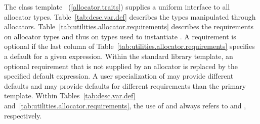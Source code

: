 \pnum
The class template ~(\ref{allocator.traits}) supplies
a uniform interface to all allocator types.
Table~\ref{tab:desc.var.def} describes the types manipulated
through allocators. Table~\ref{tab:utilities.allocator.requirements}
describes the requirements on allocator types
and thus on types used to instantiate . A requirement
is optional if the last column of
Table~\ref{tab:utilities.allocator.requirements} specifies a default for a
given expression. Within the standard library 
template, an optional requirement that is not supplied by an allocator is
replaced by the specified default expression. A user specialization of
 may provide different defaults and may provide
defaults for different requirements than the primary template. Within
Tables~\ref{tab:desc.var.def} and~\ref{tab:utilities.allocator.requirements},
the use of  and  always refers to 
and , respectively.

